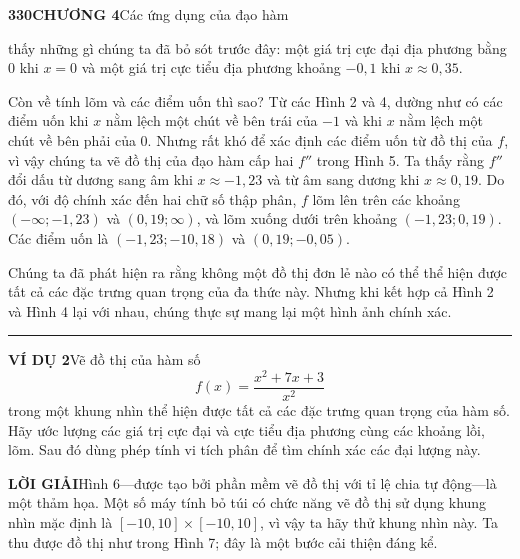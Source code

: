 \documentclass[10pt]{article}
\begin{document}
\noindent
{\small\textsf{\textbf{330}\qquad\textbf{\color{stewartblue}CHƯƠNG 4}\quad Các ứng dụng của đạo hàm}}
\par\vspace{1.2em}

\newsavebox{\rightcolbox}
\begin{lrbox}{\rightcolbox}
\begin{minipage}[t]{0.71\textwidth}
  \vspace{0pt}%
  \noindent thấy những gì chúng ta đã bỏ sót trước đây: một giá trị cực đại địa phương bằng $0$ khi $x = 0$ và một giá trị cực tiểu địa phương khoảng $-0{,}1$ khi $x \approx 0{,}35$.

  Còn về tính lõm và các điểm uốn thì sao? Từ các Hình 2 và 4, dường như có các điểm uốn khi $x$ nằm lệch một chút về bên trái của $-1$ và khi $x$ nằm lệch một chút về bên phải của $0$. Nhưng rất khó để xác định các điểm uốn từ đồ thị của $f$, vì vậy chúng ta vẽ đồ thị của đạo hàm cấp hai $f''$ trong Hình 5. Ta thấy rằng $f''$ đổi dấu từ dương sang âm khi $x \approx -1{,}23$ và từ âm sang dương khi $x \approx 0{,}19$. Do đó, với độ chính xác đến hai chữ số thập phân, $f$ lõm lên trên các khoảng $(-\infty; -1{,}23)$ và $(0{,}19; \infty)$, và lõm xuống dưới trên khoảng $(-1{,}23; 0{,}19)$. Các điểm uốn là $(-1{,}23; -10{,}18)$ và $(0{,}19; -0{,}05)$.

  Chúng ta đã phát hiện ra rằng không một đồ thị đơn lẻ nào có thể thể hiện được tất cả các đặc trưng quan trọng của đa thức này. Nhưng khi kết hợp cả Hình 2 và Hình 4 lại với nhau, chúng thực sự mang lại một hình ảnh chính xác. \hfill {\color{stewartblue}\rule{1.2ex}{1.2ex}}

  \vspace{1em}
  \noindent\textsf{\textbf{\color{stewartblue}VÍ DỤ 2}}\quad Vẽ đồ thị của hàm số
  \[
  f(x) = \frac{x^2 + 7x + 3}{x^2}
  \]
  trong một khung nhìn thể hiện được tất cả các đặc trưng quan trọng của hàm số. Hãy ước lượng các giá trị cực đại và cực tiểu địa phương cùng các khoảng lồi, lõm. Sau đó dùng phép tính vi tích phân để tìm chính xác các đại lượng này.

  \vspace{0.8em}
  \noindent\textsf{\textbf{\color{stewartblue}LỜI GIẢI}}\quad Hình 6---được tạo bởi phần mềm vẽ đồ thị với tỉ lệ chia tự động---là một thảm họa. Một số máy tính bỏ túi có chức năng vẽ đồ thị sử dụng khung nhìn mặc định là $[-10, 10] \times [-10, 10]$, vì vậy ta hãy thử khung nhìn này. Ta thu được đồ thị như trong Hình 7; đây là một bước cải thiện đáng kể.


\end{minipage}
\end{lrbox}
\end{document}
